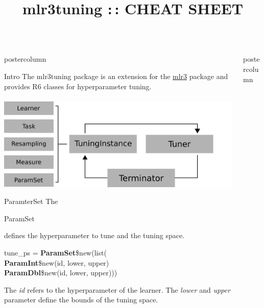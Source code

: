 \documentclass{beamer}
\title{mlr3tuning :\,: CHEAT SHEET} %
\newlength{\columnheight} %
\newcommand{\codeinline}[1]{\begin{codeboxinline}#1\end{codeboxinline}}
\begin{document}
\begin{frame}[fragile]{}
	\begin{columns}
		\begin{column}{.245\textwidth}
			\begin{beamercolorbox}[center]{postercolumn}
				\begin{minipage}{.98\textwidth}
					\parbox[t][\columnheight]{\textwidth}{
						\begin{myblock}{Intro}
							The mlr3tuning package is an extension for the \href{https://github.com/mlr-org/mlr3}{mlr3} package and provides R6 classes for hyperparameter tuning.
							\\
							\\
							\includegraphics[width=\textwidth]{img/tuning_objects.png}
						\end{myblock}
						\begin{myblock}{ParamterSet}
						The \codeinline{ParamSet} defines the hyperparameter to tune and the tuning space.
						\\
						\begin{codeboxmultiline}[width=19cm]
							tune\_ps = \textbf{ParamSet}\$new(list(\\
							\hspace*{1ex}\textbf{ParamInt}\$new(id, lower, upper)\\
							\hspace*{1ex}\textbf{ParamDbl}\$new(id, lower, upper)))
						\end{codeboxmultiline}
						The \textit{id} refers to the hyperparameter of the learner. The \textit{lower} and \textit{upper} parameter define the bounds of the tuning space. 	
					\end{myblock}	
					\vfill}
				\end{minipage}
			\end{beamercolorbox}
		\end{column}
		\begin{column}{.245\textwidth}
			\begin{beamercolorbox}[center]{postercolumn}

\end{beamercolorbox}
\end{column}
\end{columns}
\end{frame}
\end{document}
